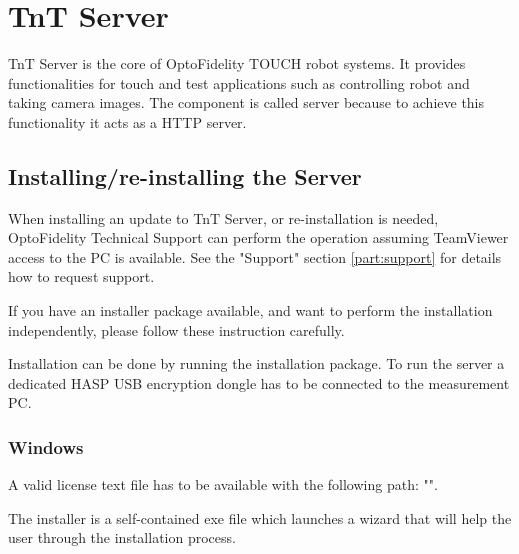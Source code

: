 \chapter{TnT Server}
TnT Server is the core of OptoFidelity TOUCH robot systems. It provides functionalities for touch and test applications such as controlling robot and taking camera images. The component is called server because to achieve this functionality it acts as a HTTP server.

\section{Installing/re-installing the Server}
\label{sec:server_installation}

When installing an update to TnT Server, or re-installation is needed, OptoFidelity Technical Support can perform the operation assuming TeamViewer access to the PC is available. See the "Support" section \ref{part:support} for details how to request support.

If you have an installer package available, and want to perform the installation independently, please follow these instruction carefully.

Installation can be done by running the installation package. To run the server a dedicated HASP USB encryption dongle has to be connected to the measurement PC.

\subsection{Windows}

A valid license text file has to be available with the following path: "\tntLicensePath".

The installer is a self-contained exe file which launches a wizard that will help the user through the installation process.

